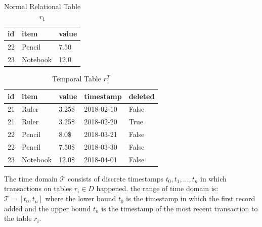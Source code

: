 		\begin{center}
		\begin{table}[t]
			\centering
			\caption{Normal Relational Table $r_1$}
			\label{table:normal_relational_table}
			\begin{tabular}{p{4cm}p{4cm}p{4cm}}
				\hline
				id & item      & value  \\ \hline
				22 & Pencil    & 7.50 \\
				23 & Notebook & 12.0   \\ \hline
			\end{tabular}
		\end{table}

		\begin{table}[t]
			\centering
			\caption{Temporal Table $r_1^T$}
			\label{table:temporal_table}
			\begin{tabular}{p{1cm}p{2cm}p{3cm}p{3cm}p{2cm}}
				\hline
				id & item      & value  & timestamp  & deleted\\ \hline
				21 & Ruler    & 3.25\$  & 2018-02-10  &  False \\  
				21 & Ruler    & 3.25\$  & 2018-02-20  &  True \\
				22 & Pencil    & 8.0\$  & 2018-03-21  &  False \\
				22 & Pencil    & 7.50\$  & 2018-03-30  &  False\\
				23 & Notebook & 12.0\$  & 2018-04-01 & False \\ \hline
			\end{tabular}
		\end{table} 
		\end{center}

		\begin{defn}
			The time domain $\mathcal{T}$ consists of discrete timestamps $t_0,t_1,...,t_n$ in which transactions on tables $r_i \in D$ happened. the range of time domain is: $\mathcal{T} = [t_0,t_n]$ where the lower bound $t_0$ is the timestamp in which the first record added and the upper bound $t_n$ is the timestamp of the most recent transaction to the table $r_i$.
		\label{dfn:time_domain}
		\end{defn}

